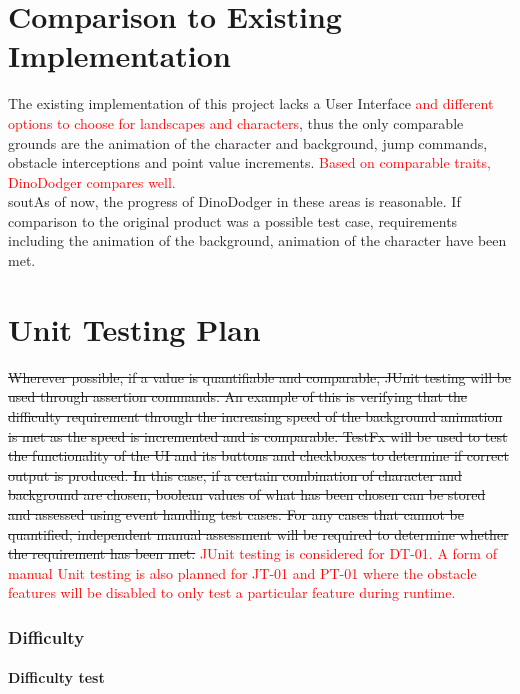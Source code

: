 \documentclass[12pt, titlepage]{article}
\begin{document}
	
\section{Comparison to Existing Implementation}
The existing implementation of this project lacks a User Interface \textcolor{red}{and different options to choose for landscapes and characters}, thus the only comparable grounds are the animation of the character and background, jump commands, obstacle interceptions and point value increments. \textcolor{red}{Based on comparable traits, DinoDodger compares well.} \\sout{As of now, the progress of DinoDodger in these areas is reasonable. If comparison to the original product was a possible test case, requirements including the animation of the background, animation of the character have been met.}	
				
\section{Unit Testing Plan}
\sout{Wherever possible, if a value is quantifiable and comparable, JUnit testing will be used through assertion commands. An example of this is verifying that the difficulty requirement through the increasing speed of the background animation is met as the speed is incremented and is comparable. TestFx will be used to test the functionality of the UI and its buttons and checkboxes to determine if correct output is produced. In this case, if a certain combination of character and background are chosen, boolean values of what has been chosen can be stored and assessed using event handling test cases. For any cases that cannot be quantified, independent manual assessment will be required to determine whether the requirement has been met.} \textcolor{red}{JUnit testing is considered for DT-01. A form of manual Unit testing is also planned for JT-01 and PT-01 where the obstacle features will be disabled to only test a particular feature during runtime.}

\subsubsection{Difficulty}
		
\paragraph{Difficulty test}
\end{document}
